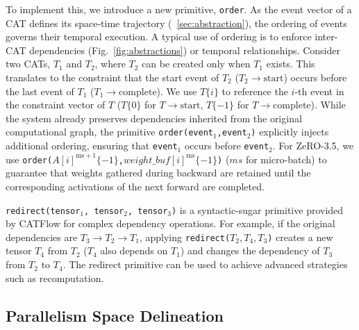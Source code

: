 \documentclass[letterpaper,twocolumn,10pt]{article}
\newcommand{\name}{CATFlow}
\begin{document}
To implement this, we introduce a new primitive, \texttt{order}. As the event vector of a CAT defines its space-time trajectory (~\cref{sec:abstraction}), the ordering of events governs their temporal execution. A typical use of ordering is to enforce inter-CAT dependencies (Fig.~\ref{fig:abstractions}) or temporal relationships. Consider two CATs, $T_1$ and $T_2$, where $T_2$ can be created only when $T_1$ exists. This translates to the constraint that the start event of $T_2$ ($T_2\rightarrow\mathrm{start}$) occurs before the last event of $T_1$ ($T_1\rightarrow\mathrm{complete}$). We use $T\{i\}$ to reference the $i$-th event in the constraint vector of $T$ ($T\{0\}$ for $T\rightarrow\mathrm{start}$, $T\{-1\}$ for $T\rightarrow\mathrm{complete}$). While the system already preserves dependencies inherited from the original computational graph, the primitive \texttt{order(event$_1$,event$_2$)} explicitly injects additional ordering, ensuring that \texttt{event$_1$} occurs before \texttt{event$_2$}. For ZeRO-3.5, we use \texttt{order($A[i]^{\mathrm{ms}+1}\{-1\}$,$weight\_buf[i]^\mathrm{ms}\{-1\}$)} ($ms$ for micro-batch) to guarantee that weights gathered during backward are retained until the corresponding activations of the next forward are completed. 

\texttt{redirect(tensor$_1$, tensor$_2$, tensor$_3$)} is a syntactic-sugar primitive provided by \name{} for complex dependency operations. For example, if the original dependencies are $T_3 \to T_2 \to T_1$, applying \texttt{redirect(}$T_2, T_4, T_3$\texttt{)} creates a new tensor $T_4$ from $T_2$ ($T_4$ also depends on $T_1$) and changes the dependency of $T_3$ from $T_2$ to $T_4$. The redirect primitive can be used to achieve advanced strategies such as recomputation.



\vspace{-.5em}
\subsection{Parallelism Space Delineation}
\vspace{-.5em}
\label{sec:delineation}
\end{document}
